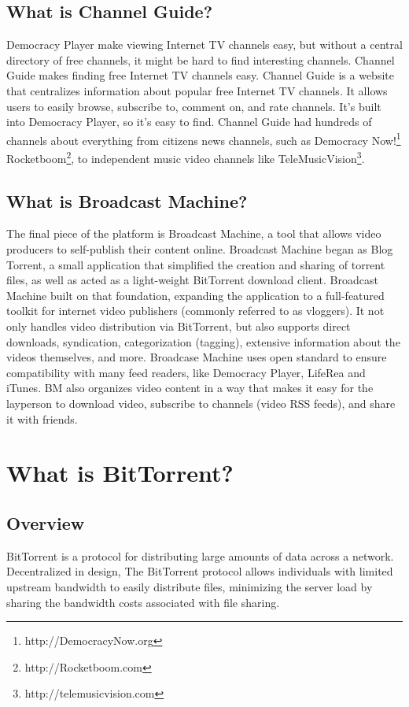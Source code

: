 \documentclass[a4paper,12pt]{report}
\begin{document}
\section {What is Channel Guide?}
Democracy Player make viewing Internet TV channels easy, but without a central directory of free channels, it might be hard to find interesting channels.
Channel Guide makes finding free Internet TV channels easy.
Channel Guide is a website that centralizes information about popular free Internet TV channels.
It allows users to easily browse, subscribe to, comment on, and rate channels.
It's built into Democracy Player, so it's easy to find.
Channel Guide had hundreds of channels about everything from citizens news channels, such as Democracy Now!\footnote {http://DemocracyNow.org} Rocketboom\footnote {http://Rocketboom.com}, to independent music video channels like TeleMusicVision\footnote{http://telemusicvision.com}.

\section{What is Broadcast Machine?}
	The final piece of the platform is Broadcast Machine, a tool that allows video producers to self-publish their content online.
	Broadcast Machine  began as Blog Torrent, a small application that simplified the creation and sharing of torrent files, as well as acted as a light-weight BitTorrent download client. 
Broadcast Machine built on that foundation, expanding the application to a full-featured toolkit for internet video publishers (commonly referred to as vloggers).
It not only handles video distribution via BitTorrent, but also supports direct downloads, syndication, categorization (tagging), extensive information about the videos themselves, and more.
Broadcase Machine uses open standard to ensure compatibility with many feed readers, like Democracy Player, LifeRea and iTunes.
BM also organizes video content in a way that makes it easy for the layperson to download video, subscribe to channels (video RSS feeds), and share it with friends.


\chapter{What is BitTorrent?}
\section{Overview}
BitTorrent is a protocol for distributing large amounts of data across a network. 
Decentralized in design, The BitTorrent protocol allows individuals with limited upstream bandwidth to easily distribute files, minimizing the server load by sharing the bandwidth costs associated with file sharing. 
\end{document}
